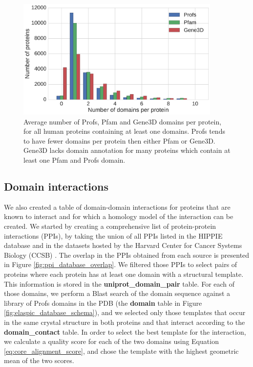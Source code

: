 \begin{figure}[!tb]
	\centering
	\includegraphics[width=0.9\textwidth]{static/profs/domains_per_protein.pdf}
	\caption[Profs, Pfam, and Gene3D domains per protein.]{Average number of Profs, Pfam and Gene3D domains per protein, for all human proteins containing at least one domains. Profs tends to have fewer domains per protein then either Pfam or Gene3D. Gene3D lacks domain annotation for many proteins which contain at least one Pfam and Profs domain.}
	\label{fig:profs_domain_size}
\end{figure}



\subsection{Domain interactions}

We also created a table of domain-domain interactions for proteins that are known to interact and for which a homology model of the interaction can be created. We started by creating a comprehensive list of protein-protein interactions (PPIs), by taking the union of all PPIs listed in the HIPPIE database \cite{schaefer_hippie:_2012} and in the datasets hosted by the Harvard Center for Cancer Systems Biology (CCSB) \cite{rolland_proteome-scale_2014}. The overlap in the PPIs obtained from each source is presented in Figure \ref{fig:ppi_database_overlap}. We filtered those PPIs to select pairs of proteins where each protein has at least one domain with a structural template. This information is stored in the \textbf{uniprot\_domain\_pair} table. For each of those domains, we perform a Blast search of the domain sequence against a library of Profs domains in the PDB (the \textbf{domain} table in Figure \ref{fig:elaspic_database_schema}), and we selected only those templates that occur in the same crystal structure in both proteins and that interact according to the \textbf{domain\_contact} table. In order to select the best template for the interaction, we calculate a quality score for each of the two domains using Equation \ref{eq:core_alignment_score}, and chose the template with the highest geometric mean of the two scores.

